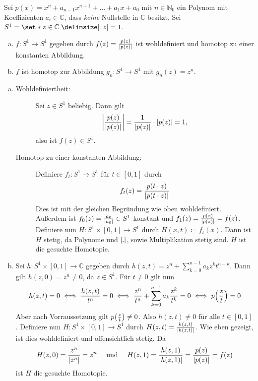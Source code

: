 Sei $p(x)= x^n + a_{n-1} x^{n-1} + \ldots + a_1 x + a_0$ mit $n \in \mathbb{N}_0$ ein Polynom mit Koeffizienten $a_i \in \mathbb{C}$, dass \emph{keine} Nullstelle in $\mathbb{C}$ besitzt. 
Sei $S^1= \set*{z \in \mathbb{C} \given \abs*{z}=1}$.
\begin{enumerate}[(a)]
	\item $f \colon S^1 \to S^1$ gegeben durch $f(z) = \frac{p(z)}{\abs*{p(z)} } $ ist wohldefiniert und homotop zu einer konstanten Abbildung.
	\item $f$ ist homotop zur Abbildung $g_n \colon S^1 \to S^1$ mit $g_n(z)= z^n$.
\end{enumerate}
\begin{enumerate}[(a)]
	\item \begin{description}
		\item[Wohldefiniertheit:] Sei $z \in S^1$ beliebig. Dann gilt
		\[
			\abs*{\frac{p(z)}{\abs*{p(z)} } } = \frac{1}{\abs*{p(z)} } \cdot \abs*{p(z)} =1,
		\]
		also ist $f(z) \in S^1$.
		\item[Homotop zu einer konstanten Abbildung:] Definiere $f_t \colon S^1 \to S^1$ für $t \in [0,1]$ durch 
		\[
			f_t(z) = \frac{p(t \cdot z)}{\abs*{p(t \cdot z)} } 
		\]
		Dies ist mit der gleichen Begründung wie oben wohldefiniert. 
		Außerdem ist $f_0(z)= \frac{a_0}{\abs*{a_0} } \in S^1 $ konstant und $f_1(z)= \frac{p(z)}{\abs*{p(z)} }=f(z)$. 
		Definiere nun $H \colon S^1 \times [0,1] \to S^1$ durch $H(x,t) \coloneqq f_t(x)$. 
		Dann ist $H$ stetig, da Polynome und $\abs*{.} $, sowie Multiplikation stetig sind. 
		$H$ ist die gesuchte Homotopie.
	\end{description}
	\item Sei $h \colon S^1 \times [0,1] \to \mathbb{C}$ gegeben durch $h(z,t) = z^n + \sum_{k=0}^{n-1} a_k z^k t^{n-k}$. 
	Dann gilt $h(z,0)=z^n \not= 0$, da $z \in S^1$.
	Für $t \neq 0$ gilt nun
	\begin{align*}
		h(z,t) = 0 \iff \frac{h(z,t)}{t^n} = 0 \iff \frac{z^n}{t^n} + \sum_{k=0}^{n-1} a_k \frac{z^k}{t^k} = 0 \iff p \enbrace*{\frac{z}{t}} = 0
	\end{align*}
	Aber nach Vorraussetzung gilt $p \enbrace*{\frac{z}{t}} \neq 0$. 
	Also $h(z,t) \neq 0$ für alle $t \in [0,1]$. 
	Definiere nun $H \colon S^1 \times [0,1]\to S^1$ durch $H(z,t) = \frac{h(z,t)}{\abs*{h(z,t)}}$. 
	Wie eben gezeigt, ist dies wohldefiniert und offensichtlich stetig. Da
	\[
		H(z,0) = \frac{z^n}{\abs*{z^n} } = z^n \quad \text{ und } \quad H(z,1) = \frac{h(z,1)}{\abs*{h(z,1)} } = \frac{p(z)}{\abs*{p(z)} } =f(z)
	\]
	ist $H$ die gesuchte Homotopie. \qedhere
\end{enumerate}

